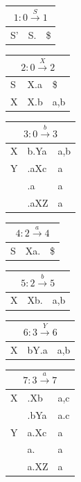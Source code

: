 \documentclass[11pt]{scrartcl}
\begin{document}
	\begin{table}[!htbp]
		\begin{tabular}[t]{l|l|l}
			\multicolumn{3}{c}{$1: 0 \xrightarrow{S} 1$} \\ \hline
			S' & S. & \$ \\ 
		\end{tabular}
		\begin{tabular}[t]{l|l|l}
			\multicolumn{3}{c}{$2: 0 \xrightarrow{X} 2$} \\ \hline
			S & X.a & \$ \\ \hline
			X & X.b & a,b 
		\end{tabular}
		\begin{tabular}[t]{l|l|l}
			\multicolumn{3}{c}{$3: 0 \xrightarrow{b} 3$} \\ \hline
			X & b.Ya & a,b \\ \hline
			Y & .aXc & a \\ 
			& .a & a \\
			& .aXZ & a 
		\end{tabular}
	\end{table}
	
	\begin{table}[!htbp]
		\begin{tabular}[t]{l|l|l}
			\multicolumn{3}{c}{$4: 2 \xrightarrow{a} 4$} \\ \hline
			S & Xa. & \$ \\ 
		\end{tabular}
		\begin{tabular}[t]{l|l|l}
			\multicolumn{3}{c}{$5: 2 \xrightarrow{b} 5$} \\ \hline
			X & Xb. & a,b \\ 
		\end{tabular}
		\begin{tabular}[t]{l|l|l}
			\multicolumn{3}{c}{$6: 3 \xrightarrow{Y} 6$} \\ \hline
			X & bY.a & a,b \\ 
		\end{tabular}
		\begin{tabular}[t]{l|l|l}
			\multicolumn{3}{c}{$7: 3 \xrightarrow{a} 7$} \\ \hline
			X & .Xb & a,c \\
			& .bYa &a.c \\ \hline
			Y & a.Xc & a \\
			& a. & a \\
			& a.XZ & a 
		\end{tabular}
	\end{table}
		
\end{document}

